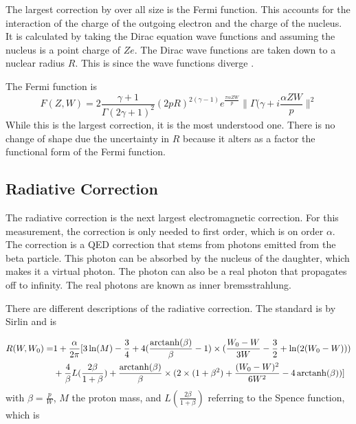 \documentclass[../MaxHughesThesis.tex]{subfiles}
\begin{document}
The largest correction by over all size is the Fermi function.
This accounts for the interaction of the charge of the outgoing electron and the charge of the nucleus.
It is calculated by taking the Dirac equation wave functions and assuming the nucleus is a point charge of $Ze$.
The Dirac wave functions are taken down to a nuclear radius $R$.
This is since the wave functions diverge \cite{Wil89}.

The Fermi function is %
\begin{equation}
	F(Z,W) = 2\frac{\gamma + 1}{\Gamma(2\gamma +1)^{2}}(2pR)^{2(\gamma - 1)}e^{\frac{\pi\alpha ZW}{p}}\|\Gamma(\gamma + i\frac{\alpha ZW}{p}\|^{2}
	\label{eq:fermifunc}
\end{equation}
While this is the largest correction, it is the most understood one.
There is no change of shape due the uncertainty in $R$ because it alters as a factor the functional form of the Fermi function. 

\subsection{Radiative Correction}
The radiative correction is the next largest electromagnetic correction.
For this measurement, the correction is only needed to first order, which is on order $\alpha$.
The correction is a QED correction that stems from photons emitted from the beta particle.
This photon can be absorbed by the nucleus of the daughter, which makes it a virtual photon.
The photon can also be a real photon that propagates off to infinity.
The real photons are known as inner bremsstrahlung.

There are different descriptions of the radiative correction.  
The standard is by Sirlin \cite{Sir67} and is %

\begin{equation}
	\label{eq:sirlinrad}
	\begin{split}
	R(W,W_{0}) = & 1 + \frac{\alpha}{2\pi}[3\ln(M) - \frac{3}{4} + 4(\frac{\operatorname{arctanh}(\beta)}{\beta} - 1)\times(\frac{W_{0} - W}{3W} - \frac{3}{2} + \ln(2(W_{0} - W))) \\
	 & + \frac{4}{\beta}L(\frac{2\beta}{1 + \beta}) + \frac{\operatorname{arctanh}(\beta)}{\beta}\times(2\times(1 + \beta^{2}) + \frac{(W_{0} - W)^{2}}{6W^{2}} - 4 \operatorname{arctanh}(\beta))]
	\end{split}
\end{equation} 
with $\beta = \frac{p}{W}$, $M$ the proton mass, and $L(\frac{2\beta}{1+\beta})$ referring to the Spence function, which is \cite{Wil95} %
\end{document}
